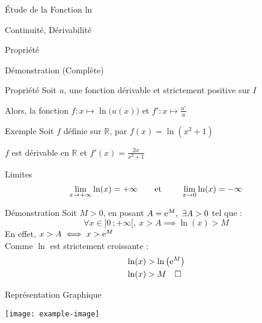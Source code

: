 \documentclass{cours}
\begin{document}
\begin{Gpartie}{Étude de la Fonction ln}
\begin{Spartie}{Continuité, Dérivabilité}
\begin{SSpartie}{Propriété}
\begin{SSSpartie}{Démonstration (Complète)}
                \end{SSSpartie}
            \end{SSpartie}
            \begin{SSpartie}{Propriété}
                Soit $u$, une fonction dérivable et strictement positive sur $I$

                Alors, la fonction $f:x\mapsto\ln\big(u(x)\big)$ et $f':x\mapsto\frac{u'}{u}$
                \begin{SSSpartie}{Exemple}
                    Soit $f$ définie sur $\mathbb{R}$, par $f(x)=\ln(x^2+1)$

                    $f$ est dérivable en $\mathbb{R}$ et $f'(x)=\frac{2x}{x^2+1}$
                \end{SSSpartie}
            \end{SSpartie}
        \end{Spartie}
        \begin{Spartie}{Limites}
            \[\lim_{x\to+\infty}\ln(x)=+\infty\text{\qquad et \qquad}\lim_{x\to 0}\ln(x)=-\infty\]
            \begin{SSpartie}{Démonstration} 
                Soit $M>0$, en posant $A=\mathrm{e}^M,\ \exists A>0$ tel que :
                \[\forall x\in\big]0\,;+\infty\big[,\ x>A\implies\ln(x)>M\]
                En effet, $x>A\iff x>\mathrm{e}^M$ \\ Comme $\ln$ est strictement croissante :
                \[\begin{aligned}[t]
                    \ln(x)&>\ln\left(\mathrm{e}^M\right) \\
                    \ln(x)&>M\quad\square
                \end{aligned}\]
            \end{SSpartie}
        \end{Spartie}
        \begin{Spartie}{Représentation Graphique}
            \begin{center}
                    \texttt{[image: example-image]}
                    \parbox{\linewidth}{}
            \end{center}
        \end{Spartie}
    \end{Gpartie}
    \pagebreak
\end{document}
